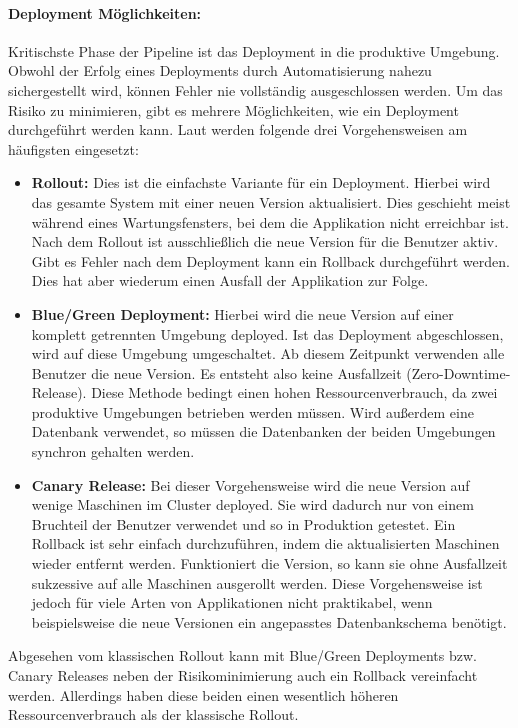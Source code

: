 \paragraph{Deployment Möglichkeiten:} 
Kritischste Phase der Pipeline ist das Deployment in die produktive Umgebung. Obwohl der Erfolg eines Deployments durch Automatisierung nahezu sichergestellt wird, können Fehler nie vollständig ausgeschlossen werden. Um das Risiko zu minimieren, gibt es mehrere Möglichkeiten, wie ein Deployment durchgeführt werden kann. Laut \cite{humble2010} werden folgende drei Vorgehensweisen am häufigsten eingesetzt:

\begin{itemize}
	\item \textbf{Rollout:} Dies ist die einfachste Variante für ein Deployment. Hierbei wird das gesamte System mit einer neuen Version aktualisiert. Dies geschieht meist während eines Wartungsfensters, bei dem die Applikation nicht erreichbar ist. Nach dem Rollout ist ausschließlich die neue Version für die Benutzer aktiv. Gibt es Fehler nach dem Deployment kann ein Rollback durchgeführt werden. Dies hat aber wiederum einen Ausfall der Applikation zur Folge.
	\item \textbf{Blue/Green Deployment:} Hierbei wird die neue Version auf einer komplett getrennten Umgebung deployed. Ist das Deployment abgeschlossen, wird auf diese Umgebung umgeschaltet. Ab diesem Zeitpunkt verwenden alle Benutzer die neue Version. Es entsteht also keine Ausfallzeit (Zero-Downtime-Release). Diese Methode bedingt einen hohen Ressourcenverbrauch, da zwei produktive Umgebungen betrieben werden müssen. Wird außerdem eine Datenbank verwendet, so müssen die Datenbanken der beiden Umgebungen synchron gehalten werden. 
	\item \textbf{Canary Release:} Bei dieser Vorgehensweise wird die neue Version auf wenige Maschinen im Cluster deployed. Sie wird dadurch nur von einem Bruchteil der Benutzer verwendet und so in Produktion getestet. Ein Rollback ist sehr einfach durchzuführen, indem die aktualisierten Maschinen wieder entfernt werden. Funktioniert die Version, so kann sie ohne Ausfallzeit sukzessive auf alle Maschinen ausgerollt werden. Diese Vorgehensweise ist jedoch für viele Arten von Applikationen nicht praktikabel, wenn beispielsweise die neue Versionen ein angepasstes Datenbankschema benötigt.
\end{itemize}

Abgesehen vom klassischen Rollout kann mit Blue/Green Deployments bzw. Canary Releases neben der Risikominimierung auch ein Rollback vereinfacht werden. Allerdings haben diese beiden einen wesentlich höheren Ressourcenverbrauch als der klassische Rollout.

